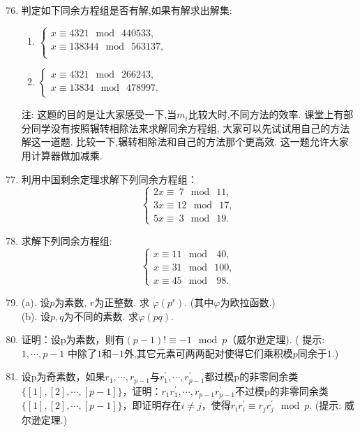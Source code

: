 \documentclass[a4paper,12pt]{article}
\begin{document}
\begin{enumerate}\setcounter{enumi}{75}

\item 判定如下同余方程组是否有解,如果有解求出解集:
\begin{enumerate}
 \item  $\begin{cases}
 x\equiv 4321 \mod\ 440533,\\
 x\equiv 138344 \mod\ 563137,\\ 
 \end{cases}$
 \item  $\begin{cases}
 x\equiv 4321 \mod\ 266243,\\
 x\equiv 13834 \mod\ 478997.\\ 
 \end{cases}$
\end{enumerate}
{\color{red} 注: 这题的目的是让大家感受一下,当$m_i$比较大时,不同方法的效率. 课堂上有部分同学没有按照辗转相除法来求解同余方程组, 大家可以先试试用自己的方法解这一道题. 比较一下,辗转相除法和自己的方法那个更高效. 这一题允许大家用计算器做加减乘.}

\item 利用中国剩余定理求解下列同余方程组：
\[\begin{cases}
 2x\equiv \ 7 \mod\ 11,\\
 3x\equiv 12 \mod\ 17,\\
 5x\equiv \ 3 \mod\ 19.
 \end{cases}\]
 \item 求解下列同余方程组:
\[\begin{cases}
 x \equiv 11 \mod\ \ 40,\\
 x \equiv 31 \mod\ 100,\\
 x \equiv 45 \mod\ \ 98.
 \end{cases}\]

 \item (a). 设$p$为素数, $r$为正整数. 求 $\varphi(p^r)$. (其中$\varphi$为欧拉函数.) \\
 (b). 设$p,q$为不同的素数. 求$\varphi(pq)$.

 \item 证明：设p为素数，则有$(p-1)! \equiv -1 \mod p$（威尔逊定理). ({\color{blue} 提示: $1,\cdots,p-1$ 中除了$1$和$-1$外,其它元素可两两配对使得它们乘积模$p$同余于$1$.})
\item 设p为奇素数，如果$r_1,\cdots,r_{p-1}$与$r_1^{'},\cdots,r_{p-1}^{'}$都过模p的非零同余类$\{ [1],[2],\cdots,[p-1]\}$，证明：$r_1r_1^{'},\cdots,r_{p-1}r_{p-1}^{'}$不过模p的非零同余类$\{ [1],[2],\cdots,[p-1]\}$，即证明存在$i\neq j$，使得$r_ir_i^{'} \equiv r_jr_j^{'} \mod p$. ({\color{blue}提示: 威尔逊定理.})


\end{enumerate}
\end{document}
